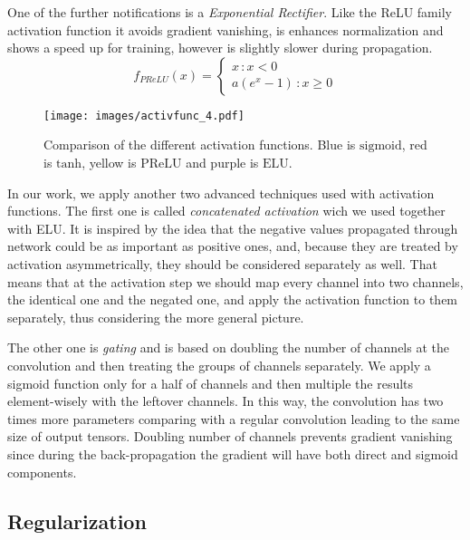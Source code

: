 One of the further notifications is a \emph{Exponential Rectifier}.
Like the ReLU family activation function it avoids gradient vanishing, is enhances normalization and shows a speed up for training\cite{bibl:elu}, however is slightly slower during propagation. 
\[ f_{PReLU}(x) = 
\begin{cases}
x \, :x<0 \\
a(e^{x}-1) \, : x \geq 0
\end{cases}
\]

\begin{figure}[ht]
	\centering
	\texttt{[image: images/activfunc\_4.pdf]}
	\caption{Comparison of the different activation functions. Blue is $\mathrm{sigmoid}$, red is $\mathrm{tanh}$, yellow is $\mathrm{PReLU}$ and purple is $\mathrm{ELU}$.}
	\label{fig:act_func}
\end{figure}


In our work, we apply another two advanced techniques used with activation functions.
The first one is called \emph{concatenated activation} wich we used together with ELU.
It is inspired by the idea that the negative values propagated through network could be as important as positive ones, and, because they are treated by activation asymmetrically, they should be considered separately as well\cite{bibl:concat_rectif}.
That means that at the activation step we should map every channel into two channels, the identical one and the negated one, and apply the activation function to them separately, thus considering the more general picture.
\medskip

The other one is \emph{gating} and is based on doubling the number of channels at the convolution and then treating the groups of channels separately.
We apply a sigmoid function only for a half of channels and then multiple the results element-wisely with the leftover channels.
In this way, the convolution has two times more parameters comparing with a regular convolution leading to the same size of output tensors.
Doubling number of channels prevents gradient vanishing since during the back-propagation the gradient will have both direct and sigmoid components\cite{bibl:conv_gating}. 

\subsection{Regularization}

